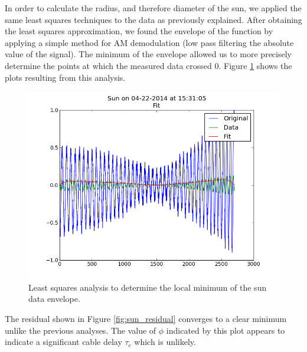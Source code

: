 \documentclass{article}
\begin{document}
    In order to calculate the radius, and therefore diameter of the sun, we
    applied the same least squares techniques to the data as previously
    explained. After obtaining the least squares approximation, we found the
    envelope of the function by applying a simple method for AM demodulation
    (low pass filtering the absolute value of the signal). The minimum of the
    envelope allowed us to more precisely determine the points at which the
    measured data crossed 0. Figure \ref{fig:sun_analysis} shows the plots
    resulting from this analysis.

    \begin{figure}[h!]
    \centering
    \includegraphics[scale=0.5]{img/sun/data_analysis.png}
    \caption{Least squares analysis to determine the local minimum of the
    sun data envelope.}
    \label{fig:sun_analysis}
    \end{figure}

    The residual shown in Figure \ref{fig:sun_residual} converges to a clear
    minimum unlike the previous analyses. The value of $\phi$ indicated by this
    plot appears to indicate a significant cable delay $\tau_c$ which is
    unlikely.
\end{document}
